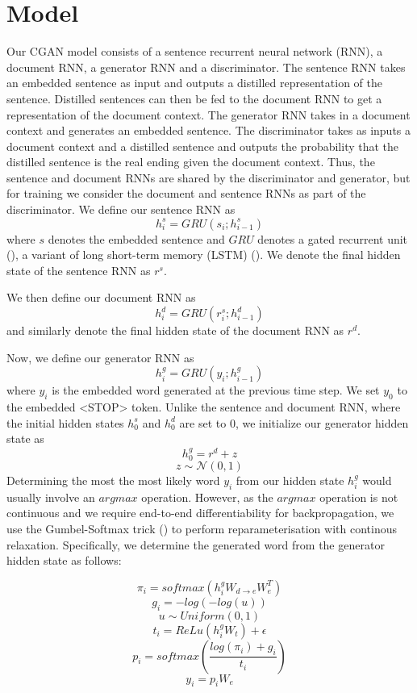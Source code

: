 \documentclass{article}
\begin{document}
\section{Model}
Our CGAN model consists of a sentence recurrent neural network (RNN), a document RNN, a generator RNN and a discriminator. The sentence RNN takes an embedded sentence as input and outputs a distilled representation of the sentence. Distilled sentences can then be fed to the document RNN to get a representation of the document context. The generator RNN takes in a document context and generates an embedded sentence. The discriminator takes as inputs a document context and a distilled sentence and outputs the probability that the distilled sentence is the real ending given the document context. Thus, the sentence and document RNNs are shared by the discriminator and generator, but for training we consider the document and sentence RNNs as part of the discriminator.
We define our sentence RNN as
$$ h^{s}_{i} = GRU(s_{i}; h^{s}_{i-1})$$
where $s$ denotes the embedded sentence and $GRU$ denotes a gated recurrent unit (\cite{DBLP:journals/corr/ChoMGBSB14}), a variant of long short-term memory (LSTM) (\cite{articffle}). We denote the final hidden state of the sentence RNN as $r^{s}$.

We then define our document RNN as
$$ h^{d}_{i} = GRU(r^{s}_{i}; h^{d}_{i-1}) $$
and similarly denote the final hidden state of the document RNN as $r^{d}$.

Now, we define our generator RNN as
$$ h^{g}_{i} = GRU(y_{i}; h^{g}_{i-1}) $$
where $y_{i}$ is the embedded word generated at the previous time step. We set $y_{0}$ to the embedded <STOP> token. Unlike the sentence and document RNN, where the initial hidden states $h^{s}_{0}$ and $h^{d}_{0}$ are set to 0, we initialize our generator hidden state as
$$ h^{g}_{0} = r^{d} + z $$
$$ z \sim \mathcal{N}(0,1) $$
Determining the most the most likely word $y_{i}$ from our hidden state $h^{g}_{i}$ would usually involve an $argmax$ operation. However, as the $argmax$ operation is not continuous and we require end-to-end differentiability for backpropagation, we use the Gumbel-Softmax trick (\cite{2016arXiv161101144J}) to perform reparameterisation with continous relaxation. Specifically, we determine the generated word from the generator hidden state as follows:

$$ \pi_{i} = softmax(h^{g}_{i}W_{d \rightarrow e}W_{e}^{T})$$
$$ g_{i} = -log(-log(u)) $$
$$ u \sim Uniform(0,1) $$
$$ t_{i} = ReLu(h^{g}_{i}W_{t}) + \epsilon $$
$$ p_{i} = softmax(\frac{log(\pi_{i}) + g_{i}}{t_{i}}) $$
$$ y_{i} = p_{i}W_{e}$$
\end{document}
